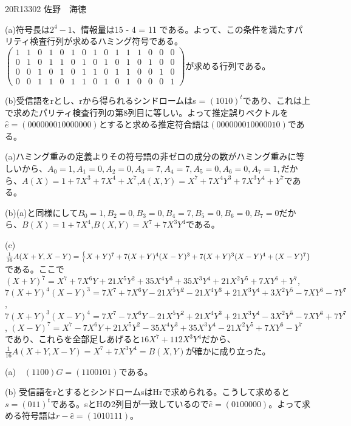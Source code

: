 \documentclass[11pt]{jsarticle}
\begin{document}
20R13302 佐野　海徳\\
\par (a)符号長は$2^4 - 1$、情報量は15 - 4 = 11 である。よって、この条件を満たすパリティ検査行列が求めるハミング符号である。
$\left(
\begin{array}{ccccccccccccccc}
1 & 1 & 0 & 1 & 0 & 1 & 0 & 1 & 0 & 1 & 1 & 1 & 0 & 0 & 0 \\
0 & 1 & 0 & 1 & 1 & 0 & 1 & 0 & 1 & 0 & 1 & 0 & 1 & 0 & 0 \\
0 & 0 & 1 & 0 & 1 & 0 & 1 & 1 & 0 & 1 & 1 & 0 & 0 & 1 & 0 \\
0 & 0 & 1 & 1 & 0 & 1 & 1 & 0 & 1 & 0 & 1 & 0 & 0 & 0 & 1
\end{array}
\right)$が求める行列である。
\par (b)受信語をrとし、rから得られるシンドロームはs = $(1010)^t$であり、これは上で求めたパリティ検査行列の第8列目に等しい。よって推定誤りベクトルを$\hat{e} = (000000010000000)$とすると求める推定符合語は$(000000010000010)$である。
\par{}
\par(a)ハミング重みの定義よりその符号語の非ゼロの成分の数がハミング重みに等しいから、$A_0 = 1, A_1 = 0,A_2 = 0,A_3 = 7, A_4 = 7, A_5 = 0,A_6 = 0,A_7 = 1,$だから、$A(X) = 1 + 7X^3 + 7X^4 + X^7$,$A(X,Y) = X^7 + 7X^4Y^3 + 7X^3Y^4 + Y^7$である。
\par(b)(a)と同様にして$B_0 = 1, B_2 = 0,B_3 = 0,B_4 = 7,B_5 = 0,B_6 = 0,B_7 = 0$だから、$B(X) = 1 + 7X^4$,$B(X,Y) = X^7 + 7X^3Y^4$である。
\par(c)$\frac{1}{16}A(X + Y,X - Y) = \frac\{(X + Y)^7 + 7(X + Y)^4(X - Y)^3 + 7(X + Y)^3(X - Y)^4 + (X - Y)^7\}$である。ここで$(X + Y)^7 = X^7 + 7X^6Y + 21X^5Y^2 + 35X^4Y^3 + 35X^3Y^4 + 21X^2Y^5 + 7XY^6 + Y^7$,
$7(X + Y)^4(X - Y)^3 = 7X^7 + 7X^6Y - 21X^5Y^2 - 21X^4Y^3 + 21X^3Y^4 + 3X^2Y^5 - 7XY^6 - 7Y^7$,$7(X + Y)^3(X - Y)^4= 7X^7 - 7X^6Y - 21X^5Y^2 + 21X^4Y^3 + 21X^3Y^4 - 3X^2Y^5 - 7XY^6 + 7Y^7$,
$(X - Y)^7 = X^7 - 7X^6Y + 21X^5Y^2 - 35X^4Y^3 + 35X^3Y^4 - 21X^2Y^5 + 7XY^6 - Y^7$であり、これらを全部足しあげると$16X^7 + 112X^3Y^4$だから、$\frac{1}{16}A(X + Y,X - Y) = X^7 + 7X^3Y^4 = B(X,Y)$が確かに成り立った。\\
\par(a)　$(1100)G = (1100101)$である。
\par(b) 受信語をrとするとシンドロームsはHrで求められる。こうして求めると$s = (011)^t$である。sとHの2列目が一致しているので$\hat{e} = (0100000)$。よって求める符号語は$r - \hat{e} = (1010111)$。\\
\end{document}
